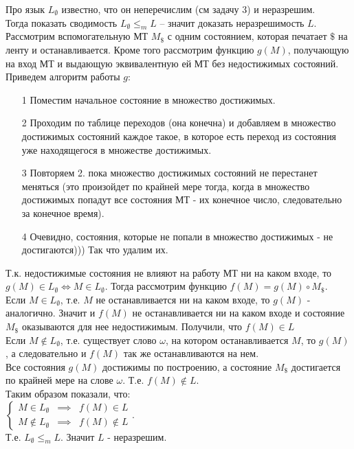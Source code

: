 \documentclass{article}
\begin{document}
Про язык $L_{\emptyset}$ известно, что он неперечислим (см задачу 3) и неразрешим.\\
Тогда показать сводимость $L_{\emptyset} \leq_m L$ -- значит доказать неразрешимость $L$.\\
Рассмотрим вспомогательную МТ $M_\$$ с одним состоянием, которая печатает $\$$ на ленту и останавливается. Кроме того рассмотрим функцию $g(M)$, получающую на вход МТ и выдающую эквивалентную ей МТ без недостижимых состояний. Приведем алгоритм работы $g$:
\begin{itemize}
	\item[1] Поместим начальное состояние в множество достижимых.
	\item[2] Проходим по таблице переходов (она конечна) и добавляем в множество достижимых состояний каждое такое, в которое есть переход из состояния уже находящегося в множестве достижимых.
	\item[3] Повторяем 2. пока множество достижимых состояний не перестанет меняться (это произойдет по крайней мере тогда, когда в множество достижимых попадут все состояния МТ - их конечное число, следовательно за конечное время).
	\item[4] Очевидно, состояния, которые не попали в множество достижимых - не достигаются))) Так что удалим их.
\end{itemize}

Т.к. недостижимые состояния не влияют на работу МТ ни на каком входе, то $g(M) \in L_{\emptyset} \Leftrightarrow M \in L_{\emptyset}$. Тогда рассмотрим функцию $f(M) = g(M) \circ M_\$$.\\ 
Если $M \in L_{\emptyset}$, т.е. $M$ не останавливается ни на каком входе, то $g(M)$ - аналогично. Значит и $f(M)$ не останавливается ни на каком входе и состояние $M_\$$ оказываются для нее недостижимым. Получили, что $f(M) \in L$\\
Если $M \notin L_{\emptyset}$, т.е. существует слово $\omega$, на котором останавливается $M$, то $g(M)$, а следовательно и $f(M)$ так же останавливаются на нем. \\
Все состояния $g(M)$ достижимы по построению, а состояние $M_\$$ достигается по крайней мере на слове $\omega$. Т.е. $f(M) \notin L$.\\
Таким образом показали, что:\\
$\left \{\begin{array}{ccc}  M \in L_{\emptyset} & \implies & f(M) \in L \\ M \not \in L_{\emptyset} & \implies & f(M) \not \in L \end{array}\right.$.\\
Т.е. $L_{\emptyset} \leq_m L$. Значит $L$ - неразрешим.
\end{document}
